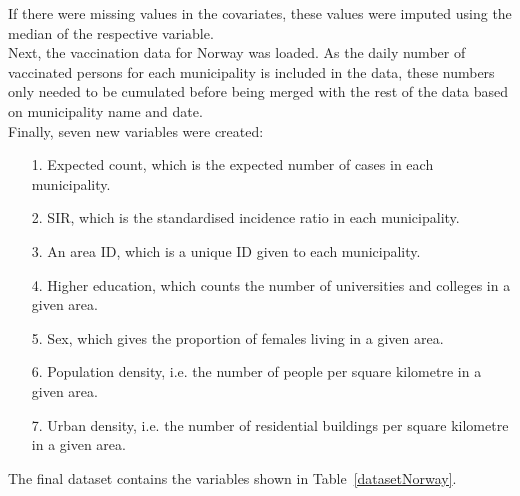 If there were missing values in the covariates, these values were imputed using the median of the respective variable. \\
Next, the vaccination data for Norway was loaded. As the daily number of vaccinated persons for each municipality is included in the data, these numbers only needed to be cumulated before being merged with the rest of the data based on municipality name and date. \\
Finally, seven new variables were created:
\begin{itemize}
    \item[1.] Expected count, which is the expected number of cases in each municipality.
    \item[2.] SIR, which is the standardised incidence ratio in each municipality.
    \item[3.] An area ID, which is a unique ID given to each municipality.
    \item[4.] Higher education, which counts the number of universities and colleges in a given area.
    \item[5.] Sex, which gives the proportion of females living in a given area.
    \item[6.] Population density, i.e. the number of people per square kilometre in a given area.
    \item[7.] Urban density, i.e. the number of residential buildings per square kilometre in a given area.
\end{itemize}
The final dataset contains the variables shown in Table~\ref{datasetNorway}.
